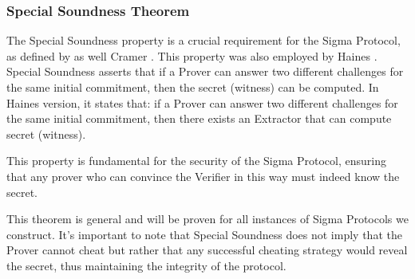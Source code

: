 \subsubsection{Special Soundness Theorem}
The Special Soundness property is a crucial requirement for the Sigma Protocol, as defined by as well Cramer \cite{Cramer1997ModularDO}. This property was also employed by Haines \cite{Haines2019VerifiedVF}. Special Soundness asserts that if a Prover can answer two different challenges for the same initial commitment, then the secret (witness) can be computed. In Haines version, it states that: if a Prover can answer two different challenges for the same initial commitment, then there exists an Extractor that can compute secret (witness). 

This property is fundamental for the security of the Sigma Protocol, ensuring that any prover who can convince the Verifier in this way must indeed know the secret.

This theorem is general and will be proven for all instances of Sigma Protocols we construct. It's important to note that Special Soundness does not imply that the Prover cannot cheat but rather that any successful cheating strategy would reveal the secret, thus maintaining the integrity of the protocol.

